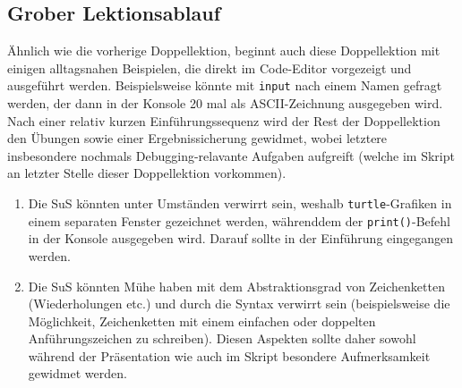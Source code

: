 \begin{myExBox}[title=DL \themycounter]
\subsection*{Grober Lektionsablauf}

Ähnlich wie die vorherige Doppellektion, beginnt auch diese Doppellektion mit einigen alltagsnahen Beispielen, die direkt im Code-Editor vorgezeigt und ausgeführt werden. Beispielsweise könnte mit \lstinline|input| nach einem Namen gefragt werden, der dann in der Konsole 20 mal als ASCII-Zeichnung ausgegeben wird. Nach einer relativ kurzen Einführungssequenz wird der Rest der Doppellektion den Übungen sowie einer Ergebnissicherung gewidmet, wobei letztere insbesondere nochmals Debugging-relavante Aufgaben aufgreift (welche im Skript an letzter Stelle dieser Doppellektion vorkommen).

\begin{myExBox}[title=Mögliche Schwierigkeiten \& geeignete Massnahmen]
\begin{enumerate}
    \item Die SuS könnten unter Umständen verwirrt sein, weshalb \lstinline|turtle|-Grafiken in einem separaten Fenster gezeichnet werden, währenddem der \lstinline|print()|-Befehl in der Konsole ausgegeben wird. Darauf sollte in der Einführung eingegangen werden.
    \item Die SuS könnten Mühe haben mit dem Abstraktionsgrad von Zeichenketten (Wiederholungen etc.) und durch die Syntax verwirrt sein (beispielsweise die Möglichkeit, Zeichenketten mit einem einfachen oder doppelten Anführungszeichen zu schreiben). Diesen Aspekten sollte daher sowohl während der Präsentation wie auch im Skript besondere Aufmerksamkeit gewidmet werden.
\end{enumerate}
\end{myExBox}
\end{myExBox}
\newpage{}

